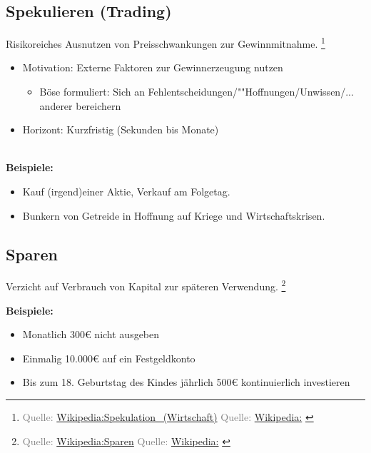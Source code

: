 \documentclass{beamer}
\newcommand{\n}{\hfill\\\vspace{0.25cm}}
\let\oldfootnote\footnote
\renewcommand{\footnote}[1]
{%
	\oldfootnote
	{
		\tiny
		\textcolor{gray}{#1}
	}%
}
\newcommand{\citewiki}[2][]
{%
	\footnote
	{
		\ifthenelse{\isempty{#1}}
		{
			Quelle: \href{https://de.wikipedia.org/wiki/#2}{Wikipedia:#2}
		}
		{
			Quelle: \href{https://de.wikipedia.org/wiki/#2}{Wikipedia:#1}
		}
	}
}
\begin{document}
		\subsection{Spekulieren (Trading)}
		
			\begin{frame}
				\begin{definition}
					Risikoreiches Ausnutzen von Preisschwankungen zur Gewinnmitnahme.\citewiki{Spekulation\_(Wirtschaft)}
				\end{definition}
				\begin{itemize}
					\item Motivation: Externe Faktoren zur Gewinnerzeugung nutzen
					\begin{itemize}
						\item Böse formuliert: Sich an Fehlentscheidungen/""Hoffnungen/Unwissen/... anderer bereichern
					\end{itemize}
					\item Horizont: Kurzfristig (Sekunden bis Monate)
				\end{itemize}\n
				\textbf{Beispiele:}
				\begin{itemize}
					\item Kauf (irgend)einer Aktie, Verkauf am Folgetag.
					\item Bunkern von Getreide in Hoffnung auf Kriege und Wirtschaftskrisen.
				\end{itemize}
			\end{frame}
		
		\subsection{Sparen}
		
			\begin{frame}
				\begin{definition}
					Verzicht auf Verbrauch von Kapital zur späteren Verwendung.\citewiki{Sparen}
				\end{definition}\hfill
				
				\textbf{Beispiele:}
				\begin{itemize}
					\item Monatlich 300€ nicht ausgeben
					\item Einmalig 10.000€ auf ein Festgeldkonto
					\item Bis zum 18. Geburtstag des Kindes jährlich 500€ kontinuierlich investieren
				\end{itemize}
			\end{frame}
		
\end{document}
